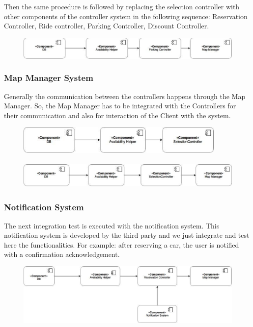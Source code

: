 Then the same procedure is followed by replacing the selection controller with other components of the controller system in the following sequence: Reservation Controller, Ride controller, Parking Controller, Discount Controller.

\begin{figure}[H]
	\centering
	\includegraphics[width=\linewidth,keepaspectratio]{figures/itp6.eps}
	\label{fig:itp6}
\end{figure}

\subsubsection*{Map Manager System}
Generally the communication between the controllers happens through the Map Manager. So, the Map Manager has to be integrated with the Controllers for their communication and also for interaction of the Client with the system.

\begin{figure}[H]
	\centering
	\includegraphics[height=1.4cm,keepaspectratio]{figures/itp2.eps}
	\label{fig:itp2}
\end{figure}

\begin{figure}[H]
	\centering
	\includegraphics[height=1.4cm,keepaspectratio]{figures/itp3.eps}
	\label{fig:itp3}
\end{figure}

\subsubsection*{Notification System}
The next integration test is executed with the notification system. This notification system is developed by the third party and we just integrate and test here the functionalities. For example: after reserving a car, the user is notified with a confirmation acknowledgement.

\begin{figure}[H]
	\centering
	\includegraphics[width=\linewidth,keepaspectratio]{figures/itp4.eps}
	\label{fig:itp4}
\end{figure}

